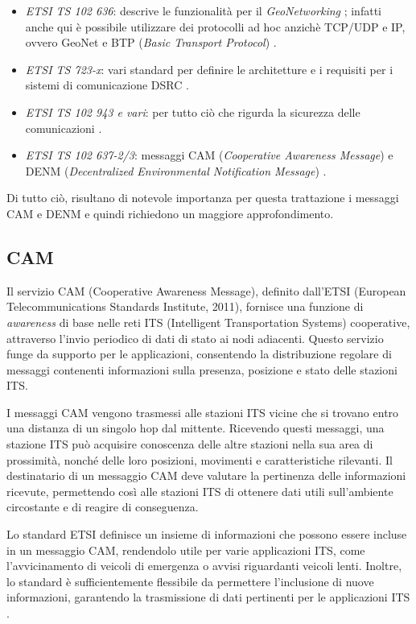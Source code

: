 \begin{itemize}
    \item \textit{ETSI TS 102 636}: descrive le funzionalità per il \textit{GeoNetworking} \cite{etsi2013intelligent}; infatti anche qui è possibile utilizzare dei protocolli ad hoc anzichè TCP/UDP e IP, ovvero GeoNet e BTP (\textit{Basic Transport Protocol}) \cite{vogt2024comprehensive}.
    \item \textit{ETSI TS 723-x}: vari standard per definire le architetture e i requisiti per i sistemi di comunicazione DSRC \cite{etsi2012intelligent}.
    \item \textit{ETSI TS 102 943 e vari}: per tutto ciò che rigurda la sicurezza delle comunicazioni \cite{etsi2012intelligent_security}.
    \item \textit{ETSI TS 102 637-2/3}: messaggi CAM (\textit{Cooperative Awareness Message}) \cite{etsi2010102} e DENM (\textit{Decentralized Environmental Notification Message}) \cite{etsi2010etsi}.
\end{itemize}

Di tutto ciò, risultano di notevole importanza per questa trattazione i messaggi CAM e DENM e quindi richiedono un maggiore approfondimento.

\subsection[CAM]{CAM}
Il servizio CAM (Cooperative Awareness Message), definito dall'ETSI (European Telecommunications Standards Institute, 2011), fornisce una funzione di \textit{awareness} di base nelle reti ITS (Intelligent Transportation Systems) cooperative, attraverso l'invio periodico di dati di stato ai nodi adiacenti. Questo servizio funge da supporto per le applicazioni, consentendo la distribuzione regolare di messaggi contenenti informazioni sulla presenza, posizione e stato delle stazioni ITS.

I messaggi CAM vengono trasmessi alle stazioni ITS vicine che si trovano entro una distanza di un singolo hop dal mittente. Ricevendo questi messaggi, una stazione ITS può acquisire conoscenza delle altre stazioni nella sua area di prossimità, nonché delle loro posizioni, movimenti e caratteristiche rilevanti. Il destinatario di un messaggio CAM deve valutare la pertinenza delle informazioni ricevute, permettendo così alle stazioni ITS di ottenere dati utili sull'ambiente circostante e di reagire di conseguenza.

Lo standard ETSI definisce un insieme di informazioni che possono essere incluse in un messaggio CAM, rendendolo utile per varie applicazioni ITS, come l'avvicinamento di veicoli di emergenza o avvisi riguardanti veicoli lenti. Inoltre, lo standard è sufficientemente flessibile da permettere l'inclusione di nuove informazioni, garantendo la trasmissione di dati pertinenti per le applicazioni ITS \cite{cam_denm}.


